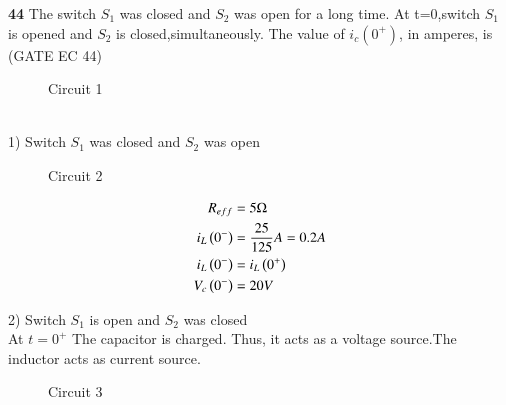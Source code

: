 \documentclass[journal,12pt,twocolumn]{IEEEtran}
\begin{document}


\vspace{3cm}

\title{}
\author{EE23BTECH11047 - Deepakreddy P
}
\maketitle
\newpage
\bigskip

\noindent \textbf{44} \quad The switch $S_1$ was closed and $S_2$ was open for a long time. At t=0,switch $S_1$ is opened and $S_2$ is closed,simultaneously. The value of $i_c(0^{+})$, in amperes, is  \hfill (GATE EC 44)

\begin{figure}[ht]
  \centering
  \begin{adjustbox}{width=\columnwidth}
      
  \end{adjustbox}
  \caption{Circuit 1}
\end{figure}

\solution
\\
1) Switch $S_1$ was closed and $S_2$ was open 
\begin{figure}[ht]
  \centering
  \begin{adjustbox}{width=\columnwidth}
      
  \end{adjustbox}
  \caption{Circuit 2}
\end{figure}

\begin{align}
    R_{eff} &= 5 \Omega \\
    i_{L} \left(0^-\right) &= \frac{25}{125} A = 0.2A\\
    i_{L} \left(0^-\right) &= i_{L} \left(0^+\right)\\
    V_c \left(0^-\right) &= 20V
\end{align}

\bigskip

2) Switch $S_1$ is open and $S_2$ was closed\\

At $t=0^{+}$ The capacitor is charged. Thus, it acts as a voltage source.The inductor acts as current source.\\

\bigskip

\begin{figure}[ht]
  \centering
  \begin{adjustbox}{width=\columnwidth}
      
  \end{adjustbox}
  \caption{Circuit 3}
\end{figure}
\end{document}
